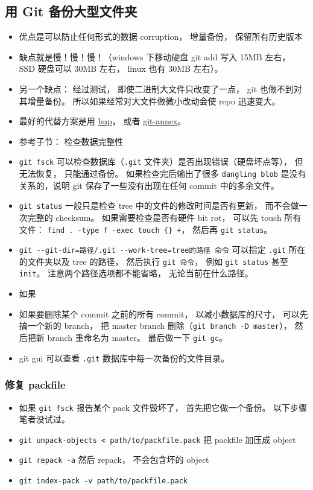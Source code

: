 \subsection{用 Git 备份大型文件夹}
\begin{itemize}
\item 优点是可以防止任何形式的数据 corruption， 增量备份， 保留所有历史版本
\item 缺点就是慢！慢！慢！（windows 下移动硬盘 git add 写入 15MB 左右， SSD 硬盘可以 30MB 左右， linux 也有 30MB 左右）。
\item 另一个缺点： 经过测试， 即使二进制大文件只改变了一点， git 也做不到对其增量备份。 所以如果经常对大文件做微小改动会使 repo 迅速变大。
\item 最好的代替方案是用 \href{https://bup.github.io/}{bup}， 或者 \href{https://git-annex.branchable.com/}{git-annex}。
\item 参考子节： 检查数据完整性
\item \verb|git fsck| 可以检查数据库（\verb|.git| 文件夹）是否出现错误（硬盘坏点等）， 但无法恢复， 只能通过备份。 如果检查完后输出了很多 \verb|dangling blob| 是没有关系的，说明 git 保存了一些没有出现在任何 commit 中的多余文件。
\item \verb|git status| 一般只是检查 tree 中的文件的修改时间是否有更新， 而不会做一次完整的 checksum。 如果需要检查是否有硬件 bit rot， 可以先 touch 所有文件： \verb|find . -type f -exec touch {} +|， 然后再 \verb|git status|。
\item \verb|git --git-dir=路径/.git --work-tree=tree的路径 命令| 可以指定 \verb|.git| 所在的文件夹以及 tree 的路径， 然后执行 \verb|git 命令|， 例如 \verb|git status| 甚至 \verb|init|。 注意两个路径选项都不能省略， 无论当前在什么路径。
\item 如果
\item 如果要删除某个 commit 之前的所有 commit， 以减小数据库的尺寸， 可以先搞一个新的 branch， 把 master branch 删除（\verb|git branch -D master|）， 然后把新 branch 重命名为 master。 最后做一下 \verb|git gc|。
\item git gui 可以查看 \verb|.git| 数据库中每一次备份的文件目录。
\end{itemize}

\subsubsection{修复 packfile}
\begin{itemize}
\item 如果 \verb|git fsck| 报告某个 pack 文件毁坏了， 首先把它做一个备份。 以下步骤笔者没试过。
\item \verb|git unpack-objects < path/to/packfile.pack| 把 packfile 加压成 object
\item \verb|git repack -a| 然后 repack， 不会包含坏的 object
\item \verb|git index-pack -v path/to/packfile.pack| 
\end{itemize}


